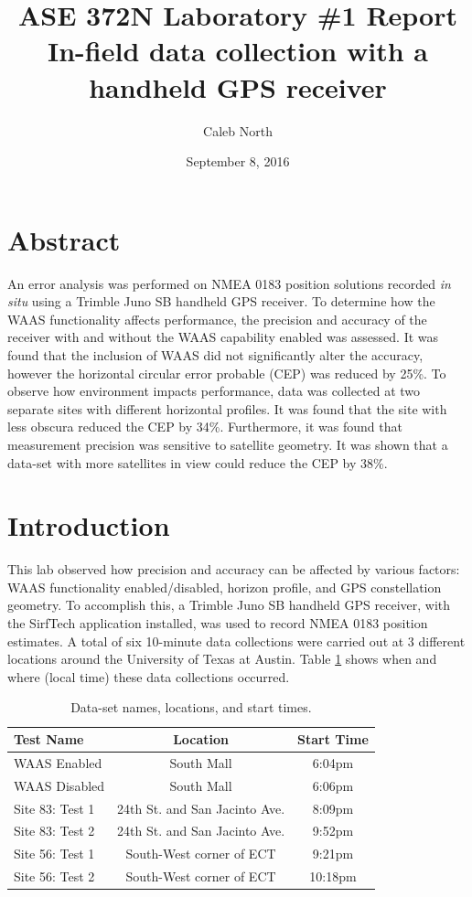 \documentclass[11pt]{article}
\title{ASE 372N Laboratory \#1 Report \\In-field data collection with a handheld GPS receiver }
\author{Caleb North} \date{September 8, 2016}
\begin{document}
\maketitle
\section{Abstract}

An error analysis was performed on NMEA 0183 position solutions recorded \textit{in situ} using a Trimble Juno SB handheld GPS receiver. To determine how the WAAS functionality affects performance, the precision and accuracy of the receiver with and without the WAAS capability enabled was assessed. It was found that the inclusion of WAAS did not significantly alter the accuracy, however the horizontal circular error probable (CEP) was reduced by 25\%. To observe how environment impacts performance, data was collected at two separate sites with different horizontal profiles. It was found that the site with less obscura reduced the CEP by 34\%. Furthermore, it was found that measurement precision was  sensitive to satellite geometry. It was shown that a data-set with more satellites in view could reduce the CEP by 38\%.

 
\section{Introduction}

This lab observed how precision and accuracy can be affected by various factors: WAAS functionality enabled/disabled, horizon profile, and GPS constellation geometry. To accomplish this, a Trimble Juno SB handheld GPS receiver, with the SirfTech application installed, was used to record NMEA 0183 position estimates. A total of six 10-minute data collections were carried out at 3 different locations around the University of Texas at Austin. Table \ref{tab:sites} shows when and where (local time) these data collections occurred. 
\\
\begin{table}[h!]
\begin{center}
    \begin{tabular}{  l || c | c| }
Test Name & Location & Start Time\\\hline
\hline
WAAS Enabled    & South Mall & 6:04pm \\\hline
WAAS Disabled   & South Mall & 6:06pm \\\hline
Site 83: Test 1 & 24th St. and San Jacinto Ave. & 8:09pm \\\hline
Site 83: Test 2 & 24th St. and San Jacinto Ave. & 9:52pm \\\hline
Site 56: Test 1 & South-West corner of ECT & 9:21pm \\\hline
Site 56: Test 2 & South-West corner of ECT & 10:18pm \\\hline
    \end{tabular}
\caption{Data-set names, locations, and start times.}
\label{tab:sites}
\end{center}
\end{table}
\end{document}
